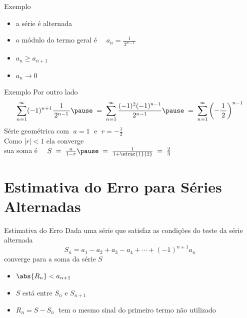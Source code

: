 \addtocounter{exemplo}{1}
\begin{frame}{Exemplo \theexemplo}
  \begin{itemize}[<+->]
    \item a série é alternada
    \item o módulo do termo geral é \(\quad a_n = \frac{1}{\,2^{n-1}\,} \)
    \item $a_n\geq a_{n+1}$
    \item $a_n\to 0$
  \end{itemize}
\end{frame}

\begin{frame}{Exemplo \theexemplo}
  Por outro lado
  \[
    \sum_{n=1}^{\infty} (-1)^{n+1} \frac{1}{\,2^{n-1}\,}
    \pause
    \;=\; \sum_{n=1}^{\infty} \frac{(-1)^2(-1)^{n-1}}{\,2^{n-1}\,}
    \pause
    \;=\; \sum_{n=1}^{\infty} \left( -\frac{1}{\,2\,} \right)^{n-1}
  \]
  \pause
  Série geométrica com $\;a=1\;$ e \(\;r=-\frac{1}{2}\;\) \\[5mm]

  \pause
  \vspace{0.5\baselineskip}
  Como $|r|<1$ ela converge \\[5mm]

  \pause
  sua soma é
  \(\quad
    S \;=\; \frac{a}{1-r}
      \pause
      \;=\; \frac{1}{1+\sfrac{1}{2}}
      \;=\; \frac{2}{3}
  \)

\end{frame}


\section{Estimativa do Erro para Séries Alternadas}

\begin{frame}{Estimativa do Erro}
  Dada uma série que satisfaz as condições do teste da série alternada
  \pause
  \[ S_n = a_1 - a_2 + a_3 - a_4 + \cdots + (-1)^{n+1}a_n \]
  converge para a soma da série $S$
  \pause
  \begin{itemize}[<+->]
    \item \( \abs{R_n} < a_{n+1} \)
    \item $S$ está entre $S_n$ e $S_{n+1}$
    \item \( R_n = S - S_n \;\) tem o mesmo sinal do primeiro termo não utilizado
  \end{itemize}
\end{frame}

